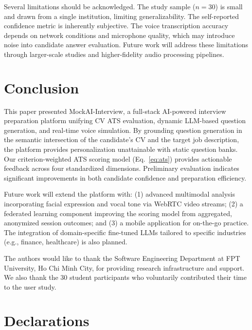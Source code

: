 \documentclass[pdflatex,sn-mathphys-num]{sn-jnl}%
\theoremstyle{thmstyleone}%
\theoremstyle{thmstyletwo}%
\theoremstyle{thmstylethree}%
\begin{document}
Several limitations should be acknowledged. The study sample ($n=30$) is small and drawn from a single institution, limiting generalizability. The self-reported confidence metric is inherently subjective. The voice transcription accuracy depends on network conditions and microphone quality, which may introduce noise into candidate answer evaluation. Future work will address these limitations through larger-scale studies and higher-fidelity audio processing pipelines.

\section{Conclusion}\label{sec7}

This paper presented MockAI-Interview, a full-stack AI-powered interview preparation platform unifying CV ATS evaluation, dynamic LLM-based question generation, and real-time voice simulation. By grounding question generation in the semantic intersection of the candidate's CV and the target job description, the platform provides personalization unattainable with static question banks. Our criterion-weighted ATS scoring model (Eq.~\ref{eq:ats}) provides actionable feedback across four standardized dimensions. Preliminary evaluation indicates significant improvements in both candidate confidence and preparation efficiency.

Future work will extend the platform with: (1) advanced multimodal analysis incorporating facial expression and vocal tone via WebRTC video streams; (2) a federated learning component improving the scoring model from aggregated, anonymized session outcomes; and (3) a mobile application for on-the-go practice. The integration of domain-specific fine-tuned LLMs tailored to specific industries (e.g., finance, healthcare) is also planned.

\backmatter


The authors would like to thank the Software Engineering Department at FPT University, Ho Chi Minh City, for providing research infrastructure and support. We also thank the 30 student participants who voluntarily contributed their time to the user study.

\section*{Declarations}
\end{document}
